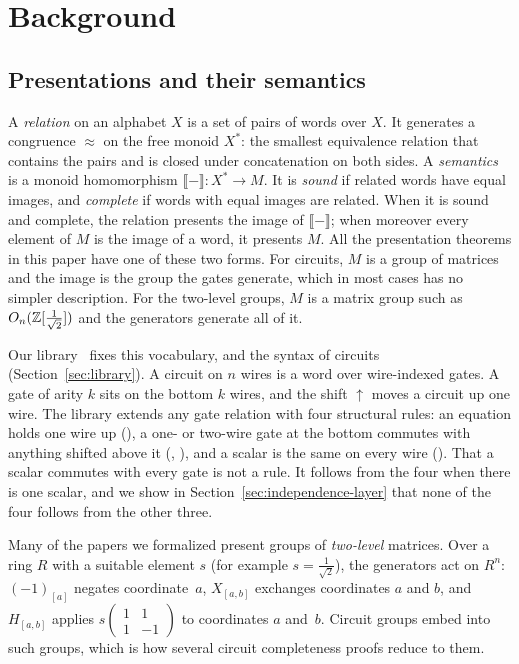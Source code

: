 \section{Background}\label{sec:background}

\subsection{Presentations and their semantics}\label{sec:presentations}

A \emph{relation} on an alphabet $X$ is a set of pairs of words over $X$.
It generates a congruence $\approx$ on the free monoid $X^*$: the
smallest equivalence relation that contains the pairs and is closed under
concatenation on both sides. A \emph{semantics} is a monoid homomorphism
$\llbracket - \rrbracket : X^* \to M$. It is \emph{sound} if related
words have equal images, and \emph{complete} if words with equal images
are related. When it is sound and complete, the relation presents the
image of $\llbracket - \rrbracket$; when moreover every element of $M$
is the image of a word, it presents $M$. All the presentation theorems in this
paper have one of these two forms. For circuits, $M$ is a group of matrices
and the image is the group the gates generate, which in most cases has
no simpler description. For the two-level groups, $M$ is a matrix group
such as $O_n(\mathbb{Z}[\frac1{\sqrt2}])$ and the generators generate all of it.

Our library~\cite{anonymous2027popl} fixes this vocabulary, and the
syntax of circuits (Section~\ref{sec:library}). A circuit on $n$
wires is a word over wire-indexed gates. A gate of arity $k$ sits on the
bottom $k$ wires, and the shift $\uparrow$ moves a circuit up one wire.
The library extends any gate relation with four structural rules: an
equation holds one wire up (), a one- or two-wire gate at the
bottom commutes with anything shifted above it (,
), and a scalar is the same on every wire (). That
a scalar commutes with every gate is not a rule. It follows from the
four when there is one scalar, and we show in
Section~\ref{sec:independence-layer} that none of the four follows
from the other three.

Many of the papers we formalized present groups of \emph{two-level}
matrices. Over a ring $R$ with a suitable element $s$ (for example
$s=\frac1{\sqrt2}$), the generators act on $R^n$: $(-1)_{[a]}$ negates
coordinate~$a$, $X_{[a,b]}$ exchanges coordinates $a$ and $b$, and
$H_{[a,b]}$ applies $s\left(\begin{smallmatrix}1&1\\1&-1\end{smallmatrix}\right)$
to coordinates $a$ and~$b$. Circuit groups embed into such groups, which
is how several circuit completeness proofs reduce to them.


